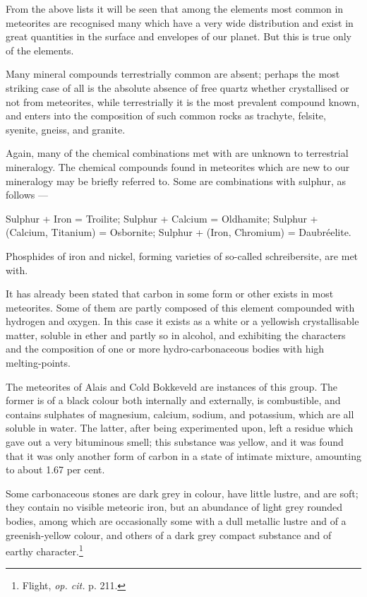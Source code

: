\documentclass[a4paper, 12pt, oneside, polutonikogreek, english]{article}
\begin{document}
From the above lists it will be seen that among the elements most common in meteorites are recognised many which have a very wide distribution and exist in great quantities in the surface and envelopes of our planet. But this is true only of the elements.

Many mineral compounds terrestrially common are absent; perhaps the most striking case of all is the absolute absence of free quartz whether crystallised or not from meteorites, while terrestrially it is the most prevalent compound known, and enters into the composition of such common rocks as trachyte, felsite, syenite, gneiss, and granite.

Again, many of the chemical combinations met with are unknown to terrestrial mineralogy. The chemical compounds found in meteorites which are new to our mineralogy may be briefly referred to. Some are combinations with sulphur, as follows ---

Sulphur + Iron = Troilite; 
Sulphur + Calcium = Oldhamite; 
Sulphur + (Calcium, Titanium) = Osbornite; 
Sulphur + (Iron, Chromium) = Daubréelite. 

Phosphides of iron and nickel, forming varieties of so-called schreibersite, are met with.

It has already been stated that carbon in some form or other exists in most meteorites. Some of them are partly composed of this element compounded with hydrogen and oxygen. In this case it exists as a white or a yellowish crystallisable matter, soluble in ether and partly so in alcohol, and exhibiting the characters and the composition of one or more hydro-carbonaceous bodies with high melting-points.

The meteorites of Alais and Cold Bokkeveld are instances of this group. The former is of a black colour both internally and externally, is combustible, and contains sulphates of magnesium, calcium, sodium, and potassium, which are all soluble in water. The latter, after being experimented upon, left a residue which gave out a very bituminous smell; this substance was yellow, and it was found that it was only another form of carbon in a state of intimate mixture, amounting to about 1.67 per cent.

Some carbonaceous stones are dark grey in colour, have little lustre, and are soft; they contain no visible meteoric iron, but an abundance of light grey rounded bodies, among which are occasionally some with a dull metallic lustre and of a greenish-yellow colour, and others of a dark grey compact substance and of earthy character.\footnote{Flight, \emph{op. cit.} p. 211.}
\end{document}
